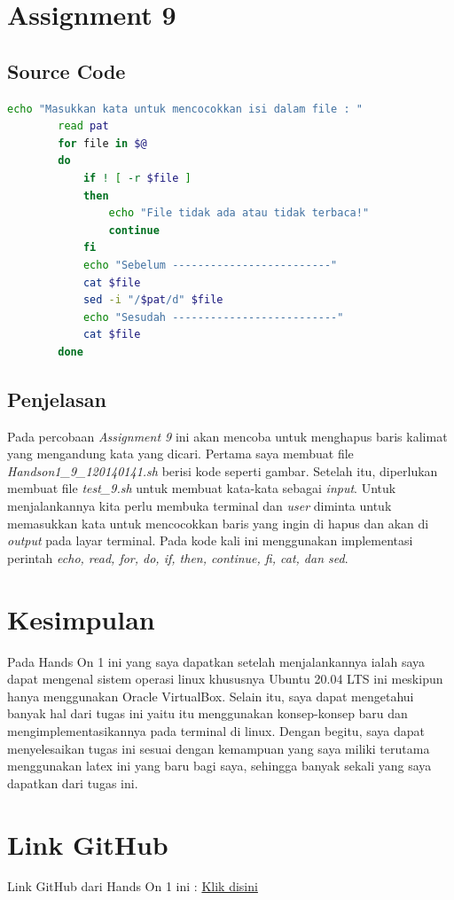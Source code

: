 \documentclass[11pt,a4paper]{article}
\begin{document}
\newpage
\section{Assignment 9}
\subsection*{Source Code}
\begin{lstlisting}[language=bash]
		echo "Masukkan kata untuk mencocokkan isi dalam file : "  
		read pat  
		for file in $@  
		do  
			if ! [ -r $file ]  
			then  
				echo "File tidak ada atau tidak terbaca!"  
				continue  
			fi  
			echo "Sebelum -------------------------"  
			cat $file  
			sed -i "/$pat/d" $file  
			echo "Sesudah --------------------------"  
			cat $file  
		done
\end{lstlisting}

\subsection*{Penjelasan}
	Pada percobaan \textit{Assignment 9} ini akan mencoba untuk menghapus baris kalimat yang mengandung kata yang dicari.
	Pertama saya membuat file \textit{Handson1\_9\_120140141.sh} berisi kode seperti gambar. Setelah itu, diperlukan membuat file \textit{test\_9.sh}
	untuk membuat kata-kata sebagai \textit{input}. Untuk menjalankannya kita perlu membuka terminal dan \textit{user} diminta untuk memasukkan 
	kata untuk mencocokkan baris yang ingin di hapus dan akan di \textit{output} pada layar terminal. Pada kode kali ini menggunakan 
	implementasi perintah \textit{echo, read, for, do, if, then, continue, fi, cat, dan sed}.

\newpage
\section{Kesimpulan}
	Pada Hands On 1 ini yang saya dapatkan setelah menjalankannya ialah saya dapat mengenal sistem operasi linux
	khususnya Ubuntu 20.04 LTS ini meskipun hanya menggunakan Oracle VirtualBox. Selain itu, saya dapat mengetahui
	banyak hal dari tugas ini yaitu itu menggunakan konsep-konsep baru dan mengimplementasikannya pada terminal di linux.
	Dengan begitu, saya dapat menyelesaikan tugas ini sesuai dengan kemampuan yang saya miliki terutama menggunakan latex
	ini yang baru bagi saya, sehingga banyak sekali yang saya dapatkan dari tugas ini.
		
\section{Link GitHub}
	Link GitHub dari Hands On 1 ini : \href{https://github.com/BilhaqAD07/Sistem-Operasi.git}{Klik disini}


\newpage


\end{document}
